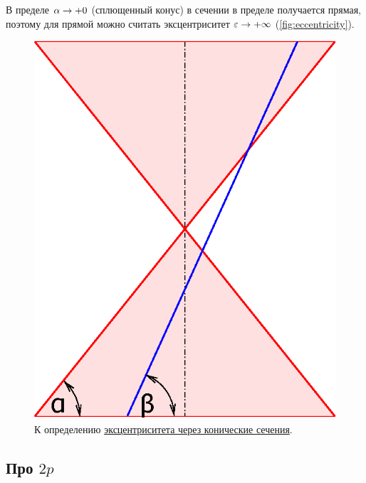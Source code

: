 \documentclass[a4paper,12pt]{article}
\begin{document}
  В пределе $\alpha \hm\to +0$ (сплющенный конус) в сечении в пределе получается прямая, поэтому для прямой можно считать эксцентриситет $\eps \hm\to +\infty$ (\ref{fig:eccentricity}).
  
  
  \begin{figure}[h]
    \centering
    
    \begin{minipage}[c]{0.25\textwidth}
      \includegraphics[width=\textwidth]{eccentricity_definition}
    \end{minipage}\hfill
    \begin{minipage}[c]{0.75\textwidth}
      \caption{К определению \href{https://en.wikipedia.org/wiki/Eccentricity_(mathematics)}{эксцентриситета через конические сечения}.}
      \label{fig:eccentricity_definition}
    \end{minipage}
  \end{figure}
  
  
  \subsection{Про $2p$}
  
\end{document}
